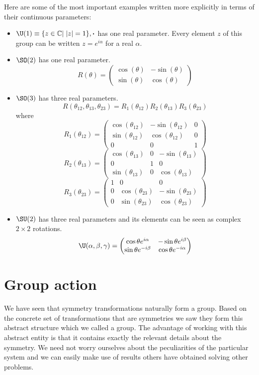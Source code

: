 Here are some of the most important examples written more explicitly in terms of their continuous parameters:
\begin{itemize}
\item $\U(1) \equiv \{z\in\mathbb{C}|\; |z|=1\}, \boldsymbol{\cdot}$ has one real parameter. Every element $z$ of this group can be written $z=e^{i\alpha}$ for a real $\alpha$.
\item $\SO(2)$ has one real parameter.
\[ R(\theta) = \begin{pmatrix}\cos(\theta) & -\sin(\theta)\\ \sin(\theta) & \cos(\theta)\end{pmatrix} \]
\item $\SO(3)$ has three real parameters.
\[ R(\theta_{12},\theta_{13},\theta_{23}) = R_1(\theta_{12})R_2(\theta_{13})R_3(\theta_{23}) \]
where
\[R_1(\theta_{12}) = \begin{pmatrix}\cos(\theta_{12}) & -\sin(\theta_{12})&0\\ \sin(\theta_{12}) & \cos(\theta_{12})&0\\0&0&1\end{pmatrix}\]
\[R_2(\theta_{13}) = \begin{pmatrix}\cos(\theta_{13}) &0& -\sin(\theta_{13})\\0&1&0\\ \sin(\theta_{13}) &0& \cos(\theta_{13})\end{pmatrix}\]
\[R_3(\theta_{23}) = \begin{pmatrix}1&0&0\\ 0&\cos(\theta_{23}) & -\sin(\theta_{23})\\0& \sin(\theta_{23}) & \cos(\theta_{23})\end{pmatrix}\]
\item $\SU(2)$ has three real parameters and its elements can be seen as complex $2\times 2$ rotations.
\[ \U(\alpha, \beta, \gamma) = \begin{pmatrix}\cos\theta e^{i\alpha} & -\sin\theta e^{i\beta}\\ \sin\theta e^{-i\beta} & \cos\theta e^{-i\alpha}\end{pmatrix} \]
\end{itemize}



\section{Group action}
We have seen that symmetry transformations naturally form a group. Based on the concrete set of transformations that are symmetries we saw they form this abstract structure which we called a group. The advantage of working with this abstract entity is that it contains exactly the relevant details about the symmetry. We need not worry ourselves about the peculiarities of the particular system and we can easily make use of results others have obtained solving other problems.

